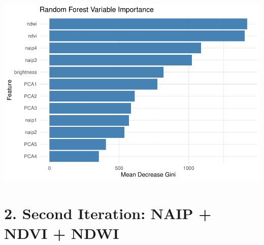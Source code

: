 \documentclass[
]{article}
\begin{document}
\includegraphics{veg_model_files/figure-latex/unnamed-chunk-5-3.pdf}

\section{2. Second Iteration: NAIP + NDVI +
NDWI}\label{second-iteration-naip-ndvi-ndwi}
\end{document}
